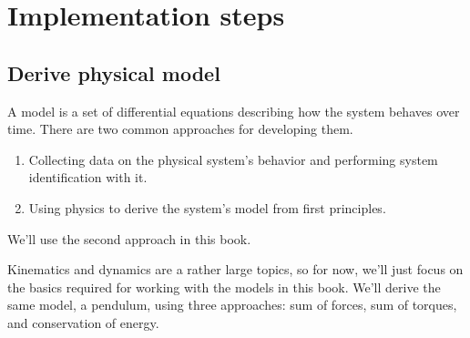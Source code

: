 \section{Implementation steps} \label{sec:implementation-steps}

\subsection{Derive physical model}

A \gls{model} is a set of differential equations describing how the system
behaves over time. There are two common approaches for developing them.

\begin{enumerate}
  \item Collecting data on the physical system's behavior and performing system
  identification with it.
  \item Using physics to derive the system's model from first principles.
\end{enumerate}

We'll use the second approach in this book.

Kinematics and dynamics are a rather large topics, so for now, we'll just focus
on the basics required for working with the models in this book. We'll derive
the same model, a pendulum, using three approaches: sum of forces, sum of
torques, and conservation of energy.

